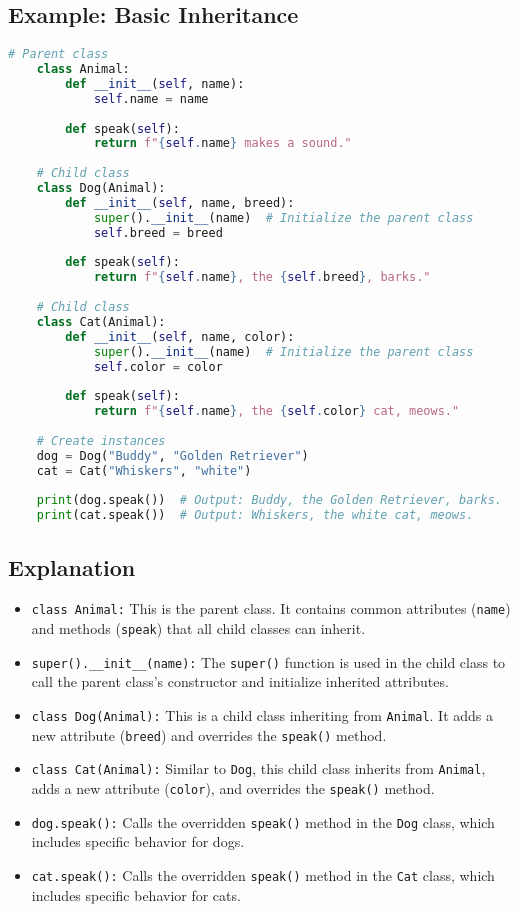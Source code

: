 \subsection{Example: Basic Inheritance}
\begin{lstlisting}[language=python, caption={Inheritance Example}]
	# Parent class
	class Animal:
		def __init__(self, name):
			self.name = name
	
		def speak(self):
			return f"{self.name} makes a sound."
	
	# Child class
	class Dog(Animal):
		def __init__(self, name, breed):
			super().__init__(name)  # Initialize the parent class
			self.breed = breed
	
		def speak(self):
			return f"{self.name}, the {self.breed}, barks."
	
	# Child class
	class Cat(Animal):
		def __init__(self, name, color):
			super().__init__(name)  # Initialize the parent class
			self.color = color
		
		def speak(self):
			return f"{self.name}, the {self.color} cat, meows."
	
	# Create instances
	dog = Dog("Buddy", "Golden Retriever")
	cat = Cat("Whiskers", "white")
	
	print(dog.speak())  # Output: Buddy, the Golden Retriever, barks.
	print(cat.speak())  # Output: Whiskers, the white cat, meows.
\end{lstlisting}

\subsection{Explanation}
\begin{itemize}
	\item \texttt{class Animal:} This is the parent class. It contains common attributes (\texttt{name}) and methods (\texttt{speak}) that all child classes can inherit.
	\item \texttt{super().\_\_init\_\_(name):} The \texttt{super()} function is used in the child class to call the parent class's constructor and initialize inherited attributes.
	\item \texttt{class Dog(Animal):} This is a child class inheriting from \texttt{Animal}. It adds a new attribute (\texttt{breed}) and overrides the \texttt{speak()} method.
	\item \texttt{class Cat(Animal):} Similar to \texttt{Dog}, this child class inherits from \texttt{Animal}, adds a new attribute (\texttt{color}), and overrides the \texttt{speak()} method.
	\item \texttt{dog.speak():} Calls the overridden \texttt{speak()} method in the \texttt{Dog} class, which includes specific behavior for dogs.
	\item \texttt{cat.speak():} Calls the overridden \texttt{speak()} method in the \texttt{Cat} class, which includes specific behavior for cats.
\end{itemize}







